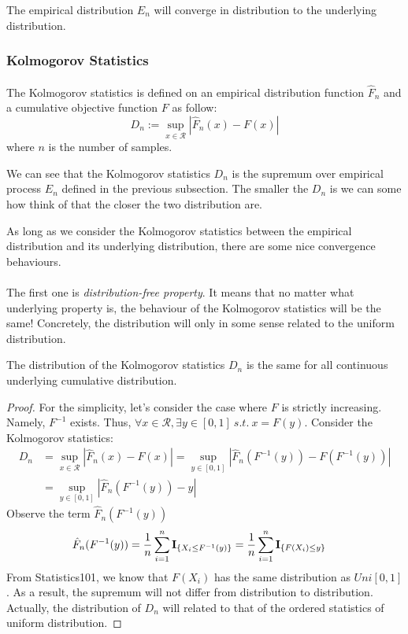 \documentclass[final_project_1.tex]{subfiles}
\begin{document}
\begin{goal}
The empirical distribution $E_n$ will converge in distribution to the underlying distribution.

\end{goal}

\subsubsection{Kolmogorov Statistics}
\paragraph{}
The Kolmogorov statistics is defined on an empirical distribution function $\hat{F}_n$ and a cumulative objective function $F$ as follow:
$$D_n:=\sup_{x\in\mathcal{R}}|\hat{F}_n(x)-F(x)|$$
where $n$ is the number of samples.

We can see that the Kolmogorov statistics $D_n$ is the supremum over empirical process $E_n$ defined in the previous subsection. The smaller the $D_n$ is we can some how think of that the closer the two distribution are.

As long as we consider the Kolmogorov statistics between the empirical distribution and its underlying distribution, there are some nice convergence behaviours.

\paragraph{}
The first one is {\it distribution-free property}. It means that no matter what underlying property is, the behaviour of the Kolmogorov statistics will be the same! Concretely, the distribution will only in some sense related to the uniform distribution.

\begin{theorem}
The distribution of the Kolmogorov statistics $D_n$ is the same for all continuous underlying cumulative distribution.
\end{theorem}

\begin{proof}
For the simplicity, let's consider the case where $F$ is strictly increasing. Namely, $F^{-1}$ exists. Thus, $\forall x \in \mathcal{R}, \exists y\in[0,1]\ s.t.\ x=F(y)$. Consider the Kolmogorov statistics:
\begin{align*}
D_n&=\sup_{x\in\mathcal{R}}|\hat{F}_n(x)-F(x)| = \sup_{y\in[0,1]}|\hat{F}_n(F^{-1}(y))-F(F^{-1}(y))|\\
&=\sup_{y\in[0,1]}|\hat{F}_n(F^{-1}(y))-y|
\end{align*}
Observe the term $\hat{F}_n(F^{-1}(y))$
\begin{align*}
\hat{F}_n(F^{-1}(y))&=\frac{1}{n}\sum^{n}_{i=1}{\bf I}_{\{X_i\leq F^{-1}(y)\}}=\frac{1}{n}\sum^{n}_{i=1}{\bf I}_{\{F(X_i)\leq y\}}
\end{align*}
From Statistics101, we know that $F(X_i)$ has the same distribution as $Uni[0,1]$. As a result, the supremum will not differ from distribution to distribution. Actually, the distribution of $D_n$ will related to that of the ordered statistics of uniform distribution.
\end{proof}
\end{document}
